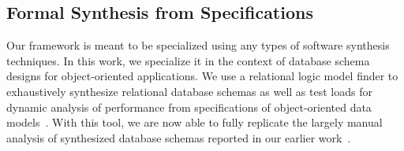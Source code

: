 \documentclass{sig-alternate}
\begin{document}
\subsection{Formal Synthesis from Specifications}



Our framework is meant to be specialized using any types of %
software synthesis techniques. 
In this work, we specialize it in the context of database schema designs for object-oriented applications.
We use a relational logic model finder to exhaustively synthesize relational database schemas as well as test loads for dynamic analysis of performance from specifications of object-oriented data models~\cite{spacemaker, trademaker}.
With this tool, we are now able to fully replicate the largely manual analysis of synthesized database schemas reported in our earlier work~\cite{trademaker}.  

\end{document}
